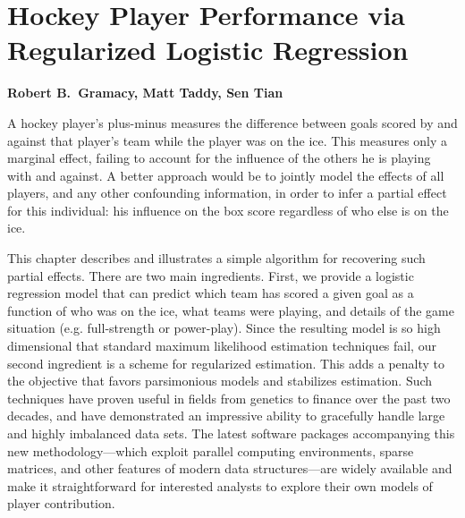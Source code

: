 
\chapter{Hockey Player Performance via Regularized Logistic Regression}

\noindent
{\bf Robert B.~Gramacy, Matt Taddy, Sen Tian}

\bigskip A hockey player's plus-minus measures the difference between goals
scored by and against that player's team while the player was on the ice.
This measures only a marginal effect, failing to account for the influence of
the others he is playing with and against.   A better approach would be to
jointly model the effects of all players, and any other confounding
information, in order to infer a partial effect for this individual: his
influence on the box score regardless of who else is on the ice.

This chapter describes and illustrates a  simple algorithm for recovering such
partial effects.  There are two main ingredients.  First, we provide a
logistic regression model that can predict which team has scored a given goal
as a function of who was on the ice, what teams were playing, and details of
the game situation (e.g. full-strength or power-play).  Since the resulting
model is so high dimensional that standard maximum likelihood estimation
techniques fail,  our second ingredient is a scheme for regularized
estimation.  This adds a penalty to the objective that favors parsimonious
models and stabilizes estimation.  Such techniques  have proven useful in
fields from genetics to finance over the past two decades, and have
demonstrated an impressive ability to gracefully handle large and highly
imbalanced data sets.  The latest software packages accompanying this new
methodology---which exploit parallel computing environments, sparse matrices,
and other features of modern data structures---are widely available and make
it straightforward for interested analysts to explore their own models of
player contribution.

